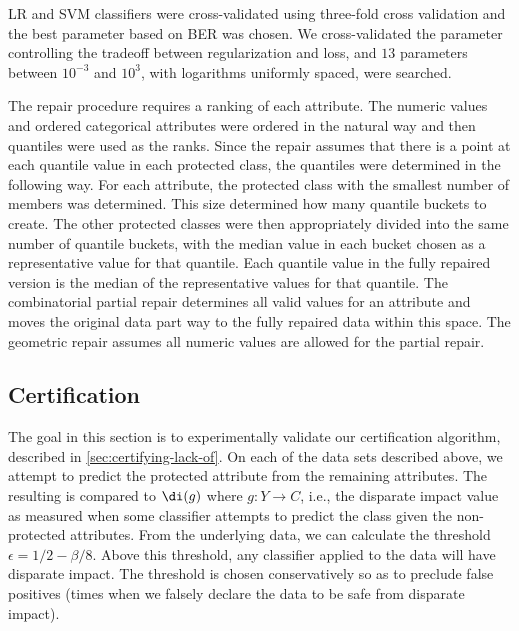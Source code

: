 \vspace*{0.1in}
LR and SVM classifiers were cross-validated using three-fold cross validation and the best parameter based on BER was chosen. 
We cross-validated the parameter controlling the tradeoff between regularization and loss, and $13$ parameters between $10^{-3}$ and $10^3$, with logarithms uniformly spaced, were searched.

\vspace*{0.1in}
The repair procedure requires a ranking of each attribute.  The numeric values and ordered categorical attributes were ordered in the natural way and then quantiles were used as the ranks.  Since the repair assumes that there is a point at each quantile value in each protected class, the quantiles were determined in the following way.  For each attribute, the protected class with the smallest number of members was determined.  This size determined how many quantile buckets to create.  The other protected classes were then appropriately divided into the same number of quantile buckets, with the median value in each bucket chosen as a representative value for that quantile.  Each quantile value in the fully repaired version is the median of the representative values for that quantile.  The combinatorial partial repair determines all valid values for an attribute and moves the original data part way to the fully repaired data within this space.  The geometric repair assumes all numeric values are allowed for the partial repair.

\subsection{Certification}
The goal in this section is to experimentally validate our certification algorithm, described in \autoref{sec:certifying-lack-of}.  On each of the data sets described above, we attempt to predict the protected attribute from the remaining attributes.  The resulting \ber is compared to $\di(g)$ where $g: Y \to C$, i.e., the disparate impact value as measured when some classifier attempts to predict the class given the non-protected attributes.  From the underlying data, we can calculate the \ber threshold $\epsilon = 1/2 - \beta / 8$.  Above this threshold, any classifier applied to the data will have disparate impact.  The threshold is chosen conservatively so as to preclude false positives (times when we falsely declare the data to be safe from disparate impact).

